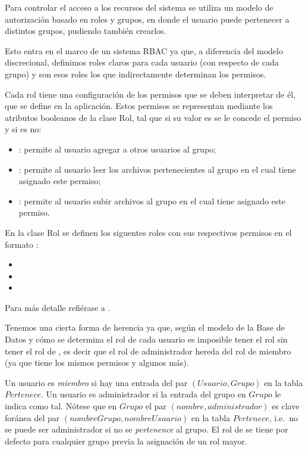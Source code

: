 
Para controlar el acceso a los recursos del sistema se utiliza un modelo de 
autorización basado en roles y grupos, en donde el usuario puede pertenecer a  
distintos grupos, pudiendo también crearlos\label{secc:autorization}. 

Esto entra en el marco de un sistema RBAC \autocite{ppt301} ya que, a 
diferencia del modelo discrecional, definimos roles claros para cada usuario
(con respecto de cada grupo) y son esos roles los que indirectamente
determinan los permisos.

Cada rol tiene una configuración de los permisos que se deben interpretar de
él, que se define en la aplicación. 
Estos permisos se representan mediante los atributos booleanos de la clase Rol, 
tal que si su valor es  se le concede el permiso y si es 
 no:

\begin{itemize}
    \item {}: permite al usuario agregar a 
    otros usuarios al grupo;
    \item {}: permite al usuario leer los 
    archivos pertenecientes al grupo en el cual tiene asignado este permiso;
    \item {}: permite al usuario subir archivos al grupo en 
    el cual tiene asignado este permiso.
\end{itemize}

En la clase Rol se definen los siguentes roles con sus respectivos permisos 
en el formato : 

\begin{itemize}
    \item {}
    \item {}
    \item {}
\end{itemize}

Para más detalle refiérase a .

Tenemos una cierta forma de herencia ya que, según el modelo de la Base de
Datos y cómo se determina el rol de cada usuario es imposible tener el rol
 sin tener el rol de , es decir que el rol de
administrador hereda del rol de miembro (ya que tiene los mismos permisos y
algunos más).

Un usuario es \emph{miembro} si hay una entrada del par \((Usuario, Grupo)\)
en la tabla \(Pertenece\).
Un usuario es administrador si la entrada del grupo en  \(Grupo\) le indica
como tal.
Nótese que en  \(Grupo\) el par  \((nombre, administrador)\) es clave foránea
del par \((nombreGrupo, nombreUsuario)\) en la tabla \(Pertenece\), i.e.\ no se
puede ser administrador si no se \emph{pertenence} al grupo.
El rol de  se tiene por defecto para cualquier grupo previa la
asignación de un rol mayor.
